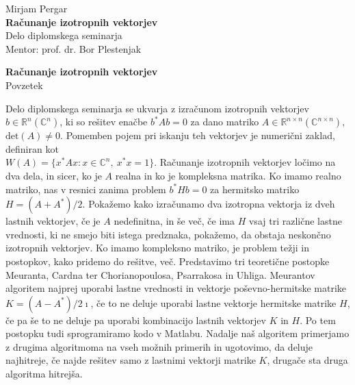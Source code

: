 \documentclass[12pt,a4paper]{amsart}
\theoremstyle{definition}
\theoremstyle{plain}
\newcommand{\R}{\mathbb R}
\newcommand{\C}{\mathbb C}
\begin{document}
\thispagestyle{empty}
\vfill

\begin{center}{\large
Mirjam Pergar\\[2mm]
{\bf Računanje izotropnih vektorjev}\\[10mm]
Delo diplomskega seminarja\\[1cm]
Mentor: prof. dr. Bor Plestenjak}
\end{center}
\vfill

\pagebreak

\thispagestyle{empty}
\tableofcontents
\pagebreak

\thispagestyle{empty}
\begin{center}
{\bf Računanje izotropnih vektorjev}\\[3mm]
{\sc Povzetek}
\end{center}
Delo diplomskega seminarja se ukvarja z izračunom izotropnih vektorjev $b\in\R^{n} (\C^{n})$, ki so rešitev enačbe $b^\ast Ab=0$ za dano matriko $A\in\R^{n\times n} (\C^{n\times n}),$ $\text{det}(A)\ne 0$.
Pomemben pojem pri iskanju teh vektorjev je numerični zaklad, definiran kot\\ $W(A)=\{x^\ast Ax\! : x \in \C^n,\ x^\ast x=1\}.$ %
Računanje izotropnih vektorjev ločimo na dva dela, in sicer, ko je $A$ realna in ko je kompleksna matrika.
Ko imamo realno matriko, nas v resnici zanima problem $b^\ast Hb=0$ za hermitsko matriko $H=(A+A^\ast)/2$. 
Pokažemo kako izračunamo dva izotropna vektorja iz dveh lastnih vektorjev, če je $A$ nedefinitna, in še več, če ima $H$ vsaj tri različne lastne vrednosti, ki ne smejo biti istega predznaka, pokažemo, da obstaja neskončno izotropnih vektorjev.
Ko imamo kompleksno matriko, je problem težji in postopkov, kako pridemo do rešitve, več. Predstavimo tri teoretične postopke Meuranta, Cardna ter Chorianopoulosa, Psarrakosa in Uhliga.
Meurantov algoritem najprej uporabi lastne vrednosti in vektorje poševno-hermitske matrike $K=(A-A^\ast)/2\imath$, če to ne deluje uporabi lastne vektorje hermitske matrike $H$, če pa še to ne deluje pa uporabi kombinacijo lastnih vektorjev $K$ in $H$.
Po tem postopku tudi sprogramiramo kodo v Matlabu.
Nadalje naš algoritem primerjamo z drugima algoritmoma na vseh možnih primerih in ugotovimo, da deluje najhitreje, če najde rešitev samo z lastnimi vektorji matrike $K$, drugače sta druga algoritma hitrejša.
\end{document}
